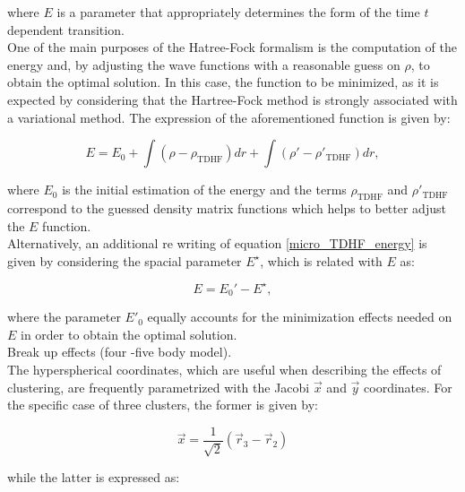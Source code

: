 \documentclass[openany]{book}
\begin{document}
where $E$ is a parameter that appropriately determines the form of the time $t$ dependent transition. \\ 

One of the main purposes of the Hatree-Fock formalism is the computation of the energy and, by adjusting the wave functions with a reasonable guess on $\rho$, to obtain the optimal solution. In this case,  the function to be minimized, as it is expected by considering that the Hartree-Fock method is strongly associated with a variational method. The expression of the aforementioned function is given by:

\begin{equation}\label{micro_TDHF_energy}
	E = E_0 + \int (\rho - \rho_{\mathrm{TDHF}} ) dr +   \int (\rho' - \rho'_{\mathrm{TDHF}} ) dr, 
\end{equation}

where $E_0$ is the initial estimation of the energy and the terms $\rho_{\mathrm{TDHF}}$ and  $\rho'_{\mathrm{TDHF}}$ correspond to the guessed density matrix functions which helps to better adjust the $E$ function.  \\

Alternatively, an additional re writing of equation  \ref{micro_TDHF_energy} is given by considering the spacial parameter $E^{\star}$, which is related with $E$ as: 

\begin{equation}\label{micro_TDHF_energy_reduced}
	E = E_0' - E^{\star},
\end{equation}

where the parameter $E'_0$ equally accounts for the minimization effects needed on $E$ in order to obtain the optimal solution. \\

Break up effects (four -five body model)\cite{shubhchintak_descouvemont_2022}. \\

The hyperspherical coordinates, which are useful when describing the effects of clustering, are frequently parametrized with the Jacobi $\vec x$ and $\vec y$ coordinates. For the specific case of three clusters, the former is given by:

\begin{equation}\label{eq:micro_cluster_breakup_jacobi_x}
	\vec x = \frac{1}{\sqrt{2}} (\vec r_3 - \vec r_2)
\end{equation}

while the latter is expressed as: 
\end{document}
